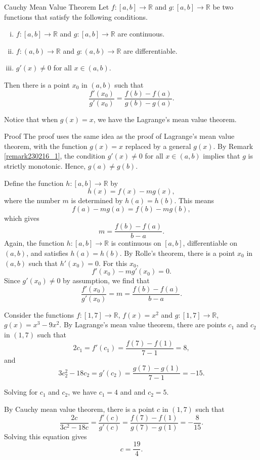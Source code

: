 \begin{theorem}[label=thm230216_2]{Cauchy Mean Value Theorem}
Let $f:[a,b]\to\mathbb{R}$ and $g:[a,b]\to\mathbb{R}$ be two functions that satisfy the following conditions.
\begin{enumerate}[(i)]
\item $f:[a,b]\to\mathbb{R}$ and $g:[a,b]\to\mathbb{R}$  are continuous.
\item $f:(a, b)\to\mathbb{R}$ and $g:(a, b)\to\mathbb{R}$ are differentiable.
\item $g'(x)\neq 0$ for all $x\in (a, b)$. 
 
\end{enumerate}
Then there is a point $x_0$ in $(a, b)$ such that \[\frac{f'(x_0)}{g'(x_0)}=\frac{f(b)-f(a)}{g(b)-g(a)}.\]
\end{theorem}
Notice that when $g(x)=x$,   we have the Lagrange's mean value theorem.
\begin{myproof}{Proof}
The proof uses the same idea as the proof of Lagrange's mean value theorem, with the function $g(x)=x$ replaced by a general $g(x)$.
By Remark \ref{remark230216_1}, the condition $g'(x)\neq 0$ for all $x\in (a, b)$ implies that $g$ is strictly monotonic. Hence, $g(a)\neq g(b)$.

 Define the function $h:[a,b]\to\mathbb{R}$ by
\[h(x)=f(x)-mg(x),\] where the number $m$ is determined by $h(a)=h(b)$. This means
\[f(a)-mg(a)=f(b)-mg(b),\] which gives
\[m=\frac{f(b)-f(a)}{b-a}.\]
Again, the function $h:[a,b]\to\mathbb{R}$ is continuous on $[a,b]$, differentiable on $(a, b)$, and satisfies $h(a)=h(b)$. By Rolle's theorem, there is a point $x_0$ in $(a, b)$ such that
$h'(x_0)=0$. For this $x_0$,
\[f'(x_0)-mg'(x_0)=0.\] Since $g'(x_0)\neq 0$ by assumption, we find that
\[\frac{f'(x_0)}{g'(x_0)}=m=\frac{f(b)-f(a)}{b-a}.\]

\end{myproof}

\begin{example}[label=ex230216_10]{}
Consider the functions $f:[1, 7]\to\mathbb{R}$, $f(x)=x^2$ and $g:[1,7]\to \mathbb{R}$, $g(x)=x^3-9x^2$. 
By Lagrange's mean value theorem, there are points $c_1$ and $c_2$ in $(1, 7)$ such that
\[2c_1=f'(c_1)=\frac{f(7)-f(1)}{7-1}=8,\]
and
\[3c_2^2-18c_2=g'(c_2)=\frac{g(7)-g(1)}{7-1}=-15.\]\end{example}

\begin{example2}{}
Solving for $c_1$ and $c_2$, we have $c_1=4$ and  and $c_2=5$. 

By Cauchy mean value theorem, there is a point $c$ in $(1, 7)$ such that
\[\frac{2c}{3c^2-18c}=\frac{f'(c)}{g'(c)}=\frac{f(7)-f(1)}{g(7)-g(1)}=-\frac{8}{15}.\]Solving this equation gives
\[c=\frac{19}{4}.\]
\end{example2}

